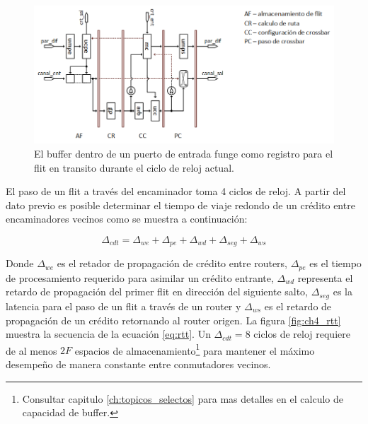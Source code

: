 \begin{figure}
	\begin{center}
		\includegraphics[width=\linewidth]{figures/ch4_segmentacion_entrada_salida.png}
	\end{center}
	\caption
		{	
			El buffer dentro de un  puerto de entrada funge como registro para el flit en transito durante el ciclo de reloj actual.
		}
	\label{fig:ch4_segmentacion_entrada_salida}
\end{figure}

El paso de un flit a través del encaminador toma 4 ciclos de reloj. A partir del dato previo es posible determinar el tiempo de viaje redondo de un crédito entre encaminadores vecinos como se muestra a continuación:

\begin{equation}
	\Delta_{cdt} =  \Delta_{we} + \Delta_{pe} + \Delta_{wd} + \Delta_{seg}  + \Delta_{ws}
	\label{eq:rtt}
\end{equation}

Donde $\Delta_{we}$ es el retador de propagación de crédito entre routers, $\Delta_{pe}$ es el tiempo de procesamiento requerido para asimilar un crédito entrante, $\Delta_{wd}$ representa el retardo de propagación del primer flit en dirección del siguiente salto, $\Delta_{seg}$ es la latencia para el paso de un flit a través de un router y $\Delta_{ws}$ es el retardo de propagación de un crédito retornando al router origen. La figura \ref{fig:ch4_rtt} muestra la secuencia de la ecuación \ref{eq:rtt}. Un $\Delta_{cdt} = 8$ ciclos de reloj requiere de al menos $2F$ espacios de almacenamiento\footnote{Consultar capitulo \ref{ch:topicos_selectos} para mas detalles en el calculo de capacidad de buffer.} para mantener el máximo desempeño de manera constante entre conmutadores vecinos. 

